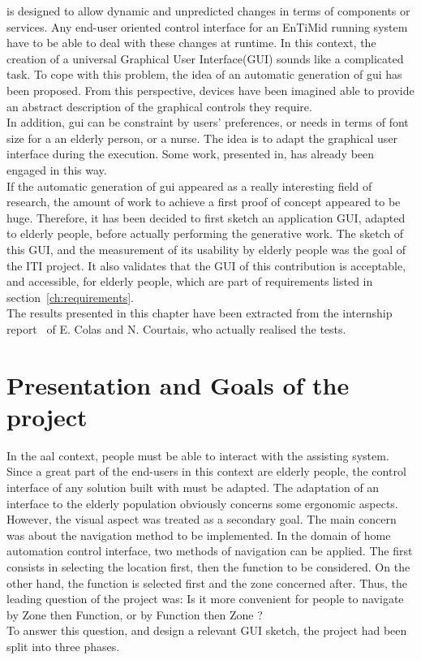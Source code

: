 \enti{} is designed to allow dynamic and unpredicted changes in terms of components or services. Any end-user oriented control interface for an EnTiMid running system have to be able to deal with these changes at runtime. In this context, the creation of a universal Graphical User Interface(GUI) sounds like a complicated task. To cope with this problem, the idea of an automatic generation of \gls{gui} has been proposed. From this perspective, devices have been imagined able to provide an abstract description of the graphical controls they require.\\
In addition, \gls{gui} can be constraint by users' preferences, or needs in terms of font size for a an elderly person, or a nurse. The idea is to adapt the graphical user interface during the execution. Some work, presented in\cite{Blouin:2011}, has already been engaged in this way.\\

If the automatic generation of \gls{gui} appeared as a really interesting field of research, the amount of work to achieve a first proof of concept appeared to be huge. Therefore, it has been decided to first sketch an application GUI, adapted to elderly people, before actually performing the generative work. The sketch of this GUI, and the measurement of its usability by elderly people was the goal of the ITI project. It also validates that the GUI of this contribution is acceptable, and accessible, for elderly people, which are part of requirements listed in section~\ref{ch:requirements}.\\

The results presented in this chapter have been extracted from the internship report~\cite{COLAS:2009} of E. Colas and N. Courtais, who actually realised the tests.

\section{Presentation and Goals of the project}

In the \gls{aal} context, people must be able to interact with the assisting system. Since a great part of the end-users in this context are elderly people, the control interface of any solution built with \enti{} must be adapted. The adaptation of an interface to the elderly population obviously concerns some ergonomic aspects. However, the visual aspect was treated as a secondary goal. The main concern was about the navigation method to be implemented. In the domain of home automation control interface, two methods of navigation can be applied. The first consists in selecting the location first, then the function to be considered. On the other hand, the function is selected first and the zone concerned after. Thus, the leading question of the project was: Is it more convenient for people to navigate by Zone then Function, or by Function then Zone ?\\
To answer this question, and design a relevant GUI sketch, the project had been split into three phases.\\

